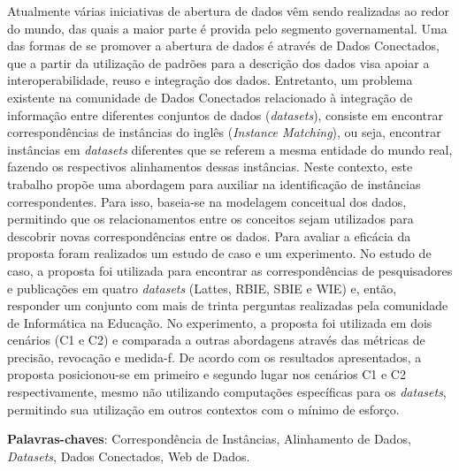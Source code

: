 
\setlength{\absparsep}{18pt} %
\begin{resumo}
Atualmente várias iniciativas de abertura de dados vêm sendo realizadas ao redor do mundo, das quais a maior parte é provida pelo segmento governamental. Uma das formas de se promover a abertura de dados é através de Dados Conectados, que a partir da utilização de padrões para a descrição dos dados visa apoiar a interoperabilidade, reuso e integração dos dados. Entretanto, um problema existente na comunidade de Dados Conectados relacionado à integração de informação entre diferentes conjuntos de dados (\textit{datasets}), consiste em encontrar correspondências de instâncias do inglês (\textit{Instance Matching}), ou seja, encontrar instâncias em \textit{datasets} diferentes que se referem a mesma entidade do mundo real, fazendo os respectivos alinhamentos dessas instâncias. Neste contexto, este trabalho propõe uma abordagem para auxiliar na identificação de instâncias correspondentes. Para isso, baseia-se na modelagem conceitual dos dados, permitindo que os relacionamentos entre os conceitos sejam utilizados para descobrir novas correspondências entre os dados. Para avaliar a eficácia da proposta foram realizados um estudo de caso e um experimento.  No estudo de caso, a proposta foi utilizada para encontrar as correspondências de pesquisadores e publicações em quatro \textit{datasets} (Lattes, RBIE, SBIE e WIE) e, então, responder um conjunto com mais de trinta perguntas realizadas pela comunidade de Informática na Educação. No experimento, a proposta foi utilizada em dois cenários (C1 e C2) e comparada a outras abordagens através das métricas de precisão, revocação e medida-f. De acordo com os resultados apresentados, a proposta posicionou-se em primeiro e segundo lugar nos cenários C1 e C2 respectivamente, mesmo não utilizando computações específicas para os \textit{datasets}, permitindo sua utilização em outros contextos com o mínimo de esforço.


 \textbf{Palavras-chaves}: Correspondência de Instâncias, Alinhamento de Dados, \textit{Datasets}, Dados Conectados, Web de Dados.
\end{resumo}

%
% 
